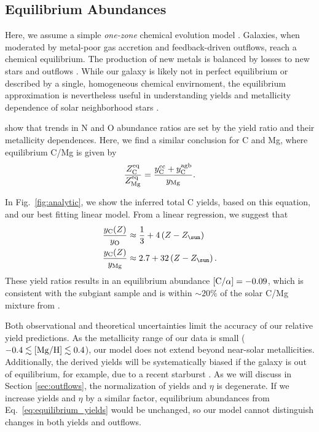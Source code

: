 \documentclass[fleqn,
usenatbib]{mnras}
\newcommand{\Yct}{\ensuremath{y_{\rm C}}}
\newcommand{\Ycc}{\ensuremath{y_{\rm C}^{\rm cc}}}
\newcommand{\Ycagb}{\ensuremath{y_{\rm C}^{\rm agb}}}
\newcommand{\Zo}{%
    \ifmmode Z_{\sun}%
    \else $Z_{\sun}$%
    \fi}
\newcommand{\about}[1]{${\sim} #1$}
\begin{document}
\subsection{Equilibrium Abundances}\label{sec:equilibrium}

Here, we assume a simple \textit{one-zone} chemical evolution model \cite[e.g.][]{tinsley80, pagel09, matteucci21}.
Galaxies, when moderated by metal-poor gas accretion and feedback-driven outflows, reach a chemical equilibrium. The production of new metals is balanced by losses to new stars and outflows \citep{larson72, dalcanton07, FD08, PS11, lilly13}.
While our galaxy is likely not in perfect equilibrium or described by a single, homogeneous chemical
envirnoment, the equilibrium approximation is nevertheless useful in understanding yields and
metallicity dependence of solar neighborhood stars \citep[e.g.][]{james_dwarf,james+23,WAF17}. 


\cite{james+23} show that trends in N and O abundance ratios are set by the yield ratio and their metallicity dependences. 
Here, we find a similar conclusion for C and Mg, where equilibrium C/Mg is given by
\begin{equation}\label{eq:equilibrium_yields}
    \frac{Z_{\rm C}^{\rm eq}}{Z_{\rm Mg}^{\rm eq}} = \frac{\Ycc + \Ycagb }{y_{\rm Mg}}.
\end{equation}

In Fig.~\ref{fig:analytic}, we show the inferred total C yields, based on this equation, and our best fitting linear model. From a linear regression, we suggest that
\begin{subequations}\label{eq:yc_inferred}
    \begin{align}
        \frac{\Yct(Z)}{y_{\rm O}} &\approx \frac{1}{3} + 4 \left(Z-\Zo\right) \\
        \frac{\Yct(Z)}{y_{\rm Mg}} &\approx 2.7 + 32 \left(Z-\Zo\right).
    \end{align}
\end{subequations}
These yield ratios results in an equilibrium abundance $[{\rm C}/\alpha] = -0.09$, which is consistent with the subgiant sample and is within \about{20\%} of the solar C/Mg mixture from \citet{asplund+09}.

Both observational and theoretical uncertainties limit the accuracy of our relative yield predictions.
As the metallicity range of our data is small ($-0.4\lesssim {\rm [Mg/H]} \lesssim 0.4$),
our model does not extend beyond near-solar metallicities.
Additionally, the derived yields will be systematically biased if the galaxy is out of equilibrium, for example, due to a recent starburst \citep{mor+19,isern19}. 
As we will discuss in Section \ref{sec:outflows}, the normalization of yields and $\eta$ is degenerate. If we increase yields and $\eta$ by a similar factor, equilibrium abundances from Eq.~\ref{eq:equilibrium_yields} would be unchanged, so our model cannot distinguish changes in both yields and outflows.
\end{document}
